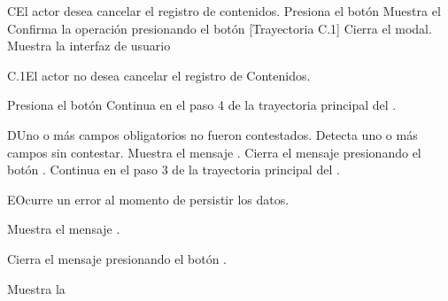
\begin{UCtrayectoriaA}{C}{El actor desea cancelar el registro de contenidos.}
    \UCpaso[\UCactor] Presiona el botón 
    \UCpaso Muestra el 
    \UCpaso[\UCactor] Confirma la operación presionando el botón  [Trayectoria C.1]
    \UCpaso Cierra el modal.
    \UCpaso Muestra la interfaz de usuario 
\end{UCtrayectoriaA}


\begin{UCtrayectoriaA}{C.1}{El actor no desea cancelar el registro de Contenidos.}

    \UCpaso[\UCactor] Presiona el botón 
    \UCpaso Continua en el paso 4 de la trayectoria principal del .

\end{UCtrayectoriaA}


\begin{UCtrayectoriaA}{D}{Uno o más campos obligatorios no fueron contestados.}
    \UCpaso Detecta uno o más campos sin contestar.
    \UCpaso Muestra el mensaje .
    \UCpaso[\UCactor] Cierra el mensaje presionando el botón .
    \UCpaso Continua en el paso 3 de la trayectoria principal del .
\end{UCtrayectoriaA}


\begin{UCtrayectoriaA}{E}{Ocurre un error al momento de persistir los datos.}
    \item Muestra el mensaje .  
    \item Cierra el mensaje presionando el botón .
    \item Muestra la 
\end{UCtrayectoriaA}
